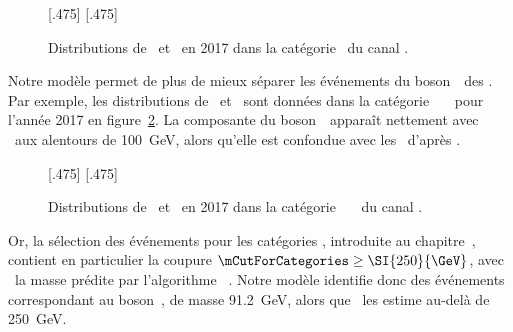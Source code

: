 \begin{figure}[h]
\centering

[.475\textwidth]
{}
\hfill
{}[.475\textwidth]
{}

\caption[Distributions de \mTtot\ et \mml\ dans la catégorie \CATnobtag\ du canal \tauh\tauh.]{Distributions de \mTtot\ et \mml\ en 2017 dans la catégorie \CATnobtag\ du canal \tauh\tauh.
}
\label{fig-distributions_mml_mttot_2017_tt_nobtag}
\end{figure}
\par
Notre modèle permet de plus de mieux séparer les événements du boson~\Zboson\ des \ftauhs.
Par exemple,
les distributions de \mTtot\ et \mml\ sont données dans la catégorie \CATbsm\ \CATnobtag\ \CATloosemt\ pour l'année 2017 en figure~\ref{fig-distributions_mml_mttot_2017_mt_BSM_nobtag_loosemt}.
La composante du boson~\Zboson\ apparaît nettement avec \mml\ aux alentours de \SI{100}{\GeV}, alors qu'elle est confondue avec les \ftauhs\ d'après \mTtot.
\begin{figure}[b]
\centering

[.475\textwidth]
{}
\hfill
{}[.475\textwidth]
{}

\caption[Distributions de \mTtot\ et \mml\ dans la catégorie \CATbsm\ \CATnobtag\ \CATloosemt\ du canal \mu\tauh.]{Distributions de \mTtot\ et \mml\ en 2017 dans la catégorie \CATbsm\ \CATnobtag\ \CATloosemt\ du canal \mu\tauh.}
\label{fig-distributions_mml_mttot_2017_mt_BSM_nobtag_loosemt}
\end{figure}
%
%
Or,
la sélection des événements pour les catégories \CATbsm,
introduite au chapitre~,
contient en particulier la coupure
$\mCutForCategories \geq \SI{250}{\GeV}$,
avec \msv\ la masse prédite par l'algorithme \SVFIT~\cite{SVFit_Bianchini_2014}.
Notre modèle identifie donc des événements correspondant au boson~\Zboson,
de masse \SI{91.2}{\GeV},
alors que \SVFIT\ les estime au-delà de \SI{250}{\GeV}.
